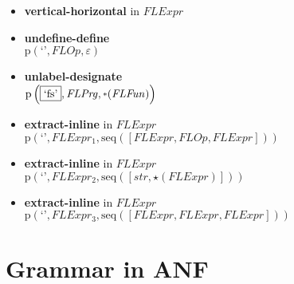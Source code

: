 {\begin{itemize}
\item \textbf{vertical-horizontal}  in $\mathit{FLExpr}$
\item \textbf{undefine-define}\\$\mathrm{p}\left(\text{`'},\mathit{FLOp},\varepsilon\right)$
\item \textbf{unlabel-designate}\\$\mathrm{p}\left(\fbox{\text{`fs'}},\mathit{FLPrg},\star \left(\mathit{FLFun}\right)\right)$
\item \textbf{extract-inline}  in $\mathit{FLExpr}$\\$\mathrm{p}\left(\text{`'},\mathit{FLExpr_1},\mathrm{seq}\left(\left[\mathit{FLExpr}, \mathit{FLOp}, \mathit{FLExpr}\right]\right)\right)$
\item \textbf{extract-inline}  in $\mathit{FLExpr}$\\$\mathrm{p}\left(\text{`'},\mathit{FLExpr_2},\mathrm{seq}\left(\left[str, \star \left(\mathit{FLExpr}\right)\right]\right)\right)$
\item \textbf{extract-inline}  in $\mathit{FLExpr}$\\$\mathrm{p}\left(\text{`'},\mathit{FLExpr_3},\mathrm{seq}\left(\left[\mathit{FLExpr}, \mathit{FLExpr}, \mathit{FLExpr}\right]\right)\right)$
\end{itemize}}

\section{Grammar in ANF}

